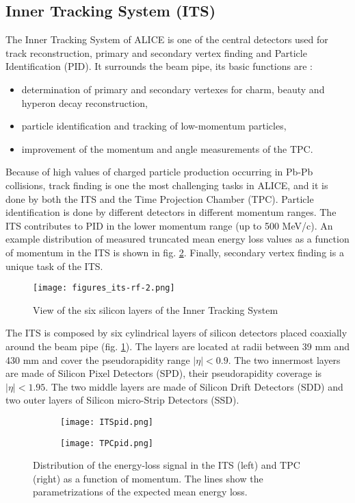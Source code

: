 \subsection{Inner Tracking System (ITS)}
The Inner Tracking System of ALICE is one of the central detectors used for track reconstruction, primary and secondary vertex finding and Particle Identification (PID).
It surrounds the beam pipe, its basic functions are \cite{ITS-TDR}:
\begin{itemize}
\item determination of primary and secondary vertexes for charm, beauty and hyperon decay reconstruction,
\item particle identification and tracking of low-momentum particles,
\item improvement of the momentum and angle measurements of the TPC.
\end{itemize}
Because of high values of charged particle production occurring in Pb-Pb collisions, track finding is one the most challenging tasks in ALICE, and it is done by both the ITS and the Time Projection Chamber (TPC). Particle identification is done by different detectors in different momentum ranges. The ITS contributes to PID in the lower momentum range (up to 500 MeV/c). An example distribution of measured truncated mean energy loss values as a function of momentum in the ITS is shown in fig. \ref{fig:imagePIDITSTPC}. Finally, secondary vertex finding is a unique task of the ITS. \\
\begin{figure}[!t]
\centering
\texttt{[image: figures\_its-rf-2.png]}
\caption{View of the six silicon layers of the Inner Tracking System}
\label{fig:image2}
\end{figure}



The ITS is composed by six cylindrical layers of silicon detectors placed coaxially around the beam pipe (fig. \ref{fig:image2}). The layers are located at radii between 39 mm and 430 mm and cover the pseudorapidity range $|\eta|<0.9$. The two innermost layers are made of Silicon Pixel Detectors (SPD), their pseudorapidity coverage is $|\eta|<1.95$.%
The two middle layers are made of Silicon Drift Detectors (SDD) and two outer layers of Silicon micro-Strip Detectors (SSD).
\begin{figure}[b]
\begin{subfigure}{0.5\textwidth}
\texttt{[image: ITSpid.png]}
\end{subfigure}
\begin{subfigure}{0.5\textwidth}
\texttt{[image: TPCpid.png]}
\end{subfigure}
\caption{Distribution of the energy-loss signal in the ITS (left) and TPC (right) as a function of momentum. The lines show the parametrizations of the expected mean energy loss.}
\label{fig:imagePIDITSTPC}
\end{figure}


